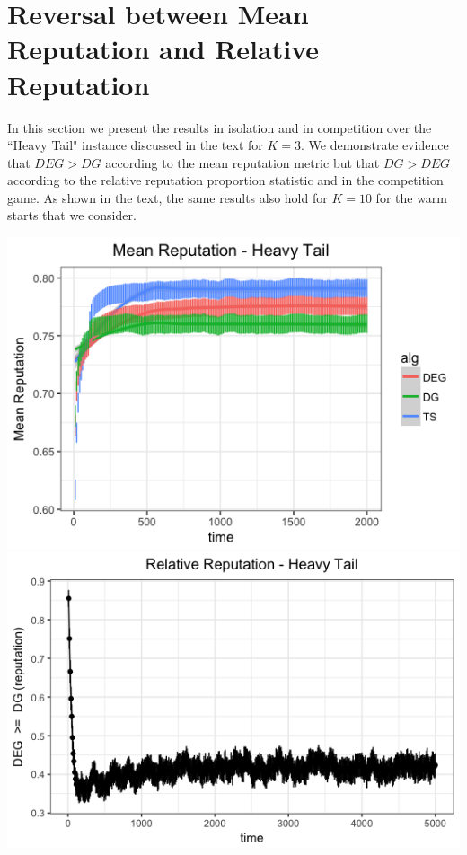\documentclass[11pt,letterpaper]{article}
\begin{document}
\pagebreak
\section{Reversal between Mean Reputation and Relative Reputation}

In this section we present the results in isolation and in competition over the ``Heavy Tail" instance discussed in the text for $K = 3$. We demonstrate evidence that $DEG > DG$ according to the mean reputation metric but that $DG > DEG$ according to the relative reputation proportion statistic and in the competition game. As shown in the text, the same results also hold for $K = 10$ for the warm starts that we consider.

\begin{center}
\includegraphics[scale=0.5]{figures/mean_ht_3_arms} \\
\includegraphics[scale=0.5]{figures/rel_rep_ht_3_arms}
\end{center}
\end{document}
